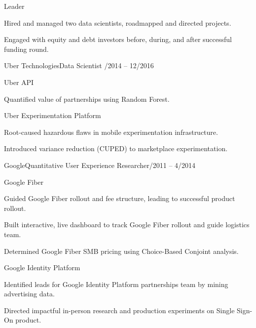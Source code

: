 \documentclass[12pt]{res}
\begin{document}
{\begin{resume}
\begin{list}{}{\leftmargin=1em}
{\begin{list}{}{\leftmargin=1em}
\begin{list}{}{\leftmargin=1em}
\begin{list}{-}{\leftmargin=1em}
\end{list}
\item Leader
\begin{list}{-}{\leftmargin=1em}
\item Hired and managed two data scientists, roadmapped and directed projects.
\item Engaged with equity and debt investors before, during, and after successful funding round.
\end{list}
\end{list}
\vspace{4mm}
\item Uber Technologies\dotfill Data Scientist /2014 -- 12/2016
\begin{list}{}{\leftmargin=1em}
\item Uber API
\begin{list}{-}{\leftmargin=1em}
\item Quantified value of partnerships using Random Forest.
\end{list}
\item Uber Experimentation Platform
\begin{list}{-}{\leftmargin=1em}
\item Root-caused hazardous flaws in mobile experimentation infrastructure.
\item Introduced variance reduction (CUPED) to marketplace experimentation.
\end{list}
\end{list}
\vspace{4mm}
\item Google\dotfill Quantitative User Experience Researcher/2011 -- 4/2014
\begin{list}{}{\leftmargin=1em}
\item Google Fiber
\begin{list}{-}{\leftmargin=1em}
\item Guided Google Fiber rollout and fee structure, leading to successful product rollout.
\item Built interactive, live dashboard to track Google Fiber rollout and guide logistics team.
\item Determined Google Fiber SMB pricing using Choice-Based Conjoint analysis.
\end{list}
\item Google Identity Platform
\begin{list}{-}{\leftmargin=1em}
\item Identified leads for Google Identity Platform partnerships team by mining advertising data.
\item Directed impactful in-person research and production experiments on Single Sign-On product.
\end{list}
\end{list}
\end{list}}
\item
\end{list}
\end{resume}
} %
\end{document}
